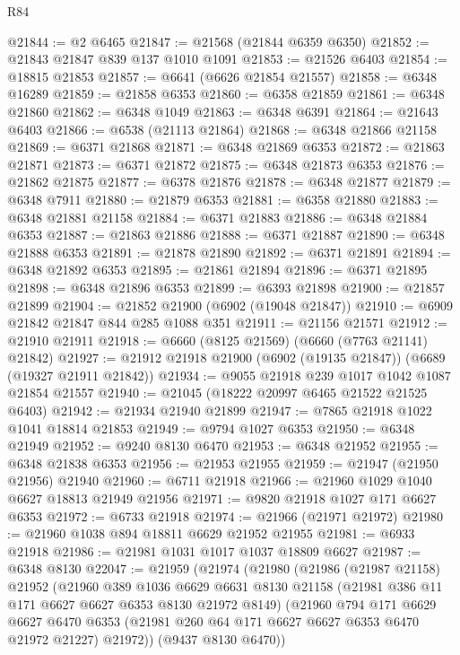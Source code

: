 \begin{lexlean}{R84}
\begin{coremodule}
@21844 := @2 @6465
@21847 := @21568 (@21844 @6359 @6350)
@21852 := @21843 @21847 @839 @137 @1010 @1091
@21853 := @21526 @6403
@21854 := @18815 @21853
@21857 := @6641 (@6626 @21854 @21557)
@21858 := @6348 @16289
@21859 := @21858 @6353
@21860 := @6358 @21859
@21861 := @6348 @21860
@21862 := @6348 @1049
@21863 := @6348 @6391
@21864 := @21643 @6403
@21866 := @6538 (@21113 @21864)
@21868 := @6348 @21866 @21158
@21869 := @6371 @21868
@21871 := @6348 @21869 @6353
@21872 := @21863 @21871
@21873 := @6371 @21872
@21875 := @6348 @21873 @6353
@21876 := @21862 @21875
@21877 := @6378 @21876
@21878 := @6348 @21877
@21879 := @6348 @7911
@21880 := @21879 @6353
@21881 := @6358 @21880
@21883 := @6348 @21881 @21158
@21884 := @6371 @21883
@21886 := @6348 @21884 @6353
@21887 := @21863 @21886
@21888 := @6371 @21887
@21890 := @6348 @21888 @6353
@21891 := @21878 @21890
@21892 := @6371 @21891
@21894 := @6348 @21892 @6353
@21895 := @21861 @21894
@21896 := @6371 @21895
@21898 := @6348 @21896 @6353
@21899 := @6393 @21898
@21900 := @21857 @21899
@21904 := @21852 @21900 (@6902 (@19048 @21847))
@21910 := @6909 @21842 @21847 @844 @285 @1088 @351
@21911 := @21156 @21571
@21912 := @21910 @21911
@21918 := @6660 (@8125 @21569) (@6660 (@7763 @21141) @21842)
@21927 := @21912 @21918 @21900 (@6902 (@19135 @21847)) (@6689 (@19327 @21911 @21842))
@21934 := @9055 @21918 @239 @1017 @1042 @1087 @21854 @21557
@21940 := @21045 (@18222 @20997 @6465 @21522 @21525 @6403)
@21942 := @21934 @21940 @21899
@21947 := @7865 @21918 @1022 @1041 @18814 @21853
@21949 := @9794 @1027 @6353
@21950 := @6348 @21949
@21952 := @9240 @8130 @6470
@21953 := @6348 @21952
@21955 := @6348 @21838 @6353
@21956 := @21953 @21955
@21959 := @21947 (@21950 @21956) @21940
@21960 := @6711 @21918
@21966 := @21960 @1029 @1040 @6627 @18813 @21949 @21956
@21971 := @9820 @21918 @1027 @171 @6627 @6353
@21972 := @6733 @21918
@21974 := @21966 (@21971 @21972)
@21980 := @21960 @1038 @894 @18811 @6629 @21952 @21955
@21981 := @6933 @21918
@21986 := @21981 @1031 @1017 @1037 @18809 @6627
@21987 := @6348 @8130
@22047 := @21959
    (@21974
      (@21980
        (@21986
          (@21987 @21158)
          @21952
          (@21960
            @389
            @1036
            @6629
            @6631
            @8130
            @21158
            (@21981 @386 @11 @171 @6627 @6627 @6353 @8130 @21972 @8149)
            (@21960
              @794
              @171
              @6629
              @6627
              @6470
              @6353
              (@21981 @260 @64 @171 @6627 @6627 @6353 @6470 @21972 @21227)
              @21972))
          (@9437 @8130 @6470))

\end{coremodule}
\end{lexlean}
